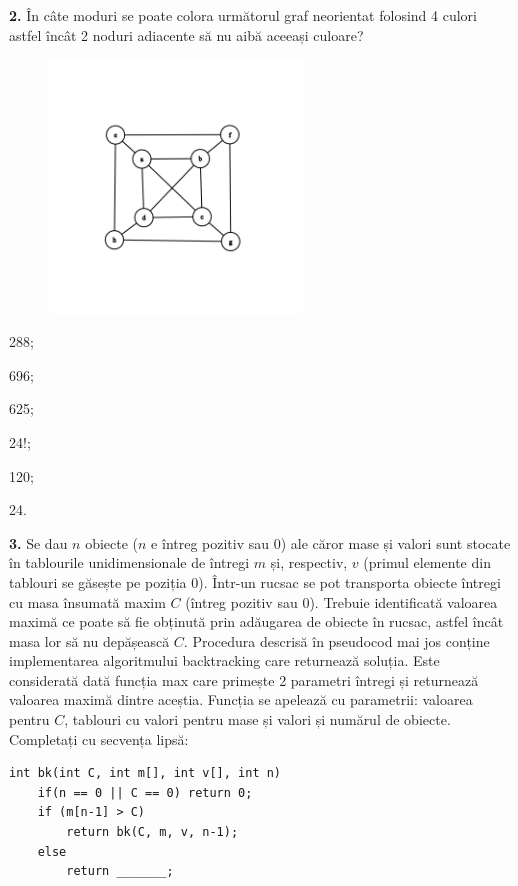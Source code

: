\documentclass[11pt, a4paper]{article}
\begin{document}
\vspace{0.5cm}

\textbf{2.}\newline
În câte moduri se poate colora următorul graf neorientat folosind 4 culori astfel încât 2 noduri adiacente să nu aibă aceeași culoare?
\begin{figure}[ht!]
    \centering
    \includegraphics[width=0.6\textwidth]{graph2.png}
\end{figure}
\begin{inparaenum}
    \item 288;
    \item 696;
    \item 625;
    \item 24!;
    \item 120;
    \item 24.
\end{inparaenum}

\vspace{0.5cm}

\textbf{3.}\newline
Se dau $n$ obiecte ($n$ e întreg pozitiv sau $0$) ale căror mase și valori sunt stocate în tablourile unidimensionale de întregi $m$ și, respectiv, $v$ (primul elemente din tablouri se găsește pe poziția $0$). Într-un rucsac se pot transporta obiecte întregi cu masa însumată maxim $C$ (întreg pozitiv sau $0$). Trebuie identificată valoarea maximă ce poate să fie obținută prin adăugarea de obiecte în rucsac, astfel încât masa lor să nu depășească $C$. Procedura descrisă în pseudocod mai jos conține implementarea algoritmului backtracking care returnează soluția. Este considerată dată funcția max care primește 2 parametri întregi și returnează valoarea maximă dintre aceștia. Funcția se apelează cu parametrii: valoarea pentru $C$, tablouri cu valori pentru mase și valori și numărul de obiecte. Completați cu secvența lipsă:
\begin{lstlisting}
int bk(int C, int m[], int v[], int n)
    if(n == 0 || C == 0) return 0;
    if (m[n-1] > C)
        return bk(C, m, v, n-1);
    else
        return _______;
\end{lstlisting}
\end{document}
